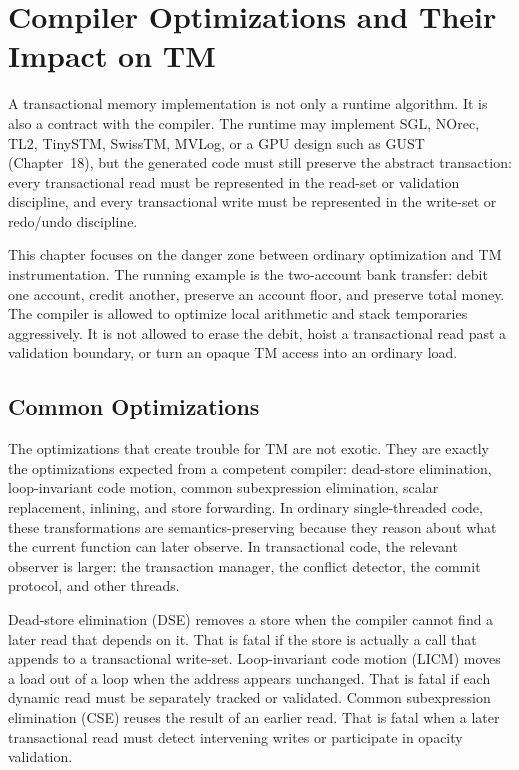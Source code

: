\chapter{Compiler Optimizations and Their Impact on TM}

A transactional memory implementation is not only a runtime algorithm. It is also a contract with the compiler. The runtime may implement SGL, NOrec, TL2, TinySTM, SwissTM, MVLog, or a GPU design such as GUST (Chapter~18), but the generated code must still preserve the abstract transaction: every transactional read must be represented in the read-set or validation discipline, and every transactional write must be represented in the write-set or redo/undo discipline.

This chapter focuses on the danger zone between ordinary optimization and TM instrumentation. The running example is the two-account bank transfer: debit one account, credit another, preserve an account floor, and preserve total money. The compiler is allowed to optimize local arithmetic and stack temporaries aggressively. It is not allowed to erase the debit, hoist a transactional read past a validation boundary, or turn an opaque TM access into an ordinary load.

\section{Common Optimizations}

The optimizations that create trouble for TM are not exotic. They are exactly the optimizations expected from a competent compiler: dead-store elimination, loop-invariant code motion, common subexpression elimination, scalar replacement, inlining, and store forwarding. In ordinary single-threaded code, these transformations are semantics-preserving because they reason about what the current function can later observe. In transactional code, the relevant observer is larger: the transaction manager, the conflict detector, the commit protocol, and other threads.

Dead-store elimination (DSE) removes a store when the compiler cannot find a later read that depends on it. That is fatal if the store is actually a call that appends to a transactional write-set. Loop-invariant code motion (LICM) moves a load out of a loop when the address appears unchanged. That is fatal if each dynamic read must be separately tracked or validated. Common subexpression elimination (CSE) reuses the result of an earlier read. That is fatal when a later transactional read must detect intervening writes or participate in opacity validation.

